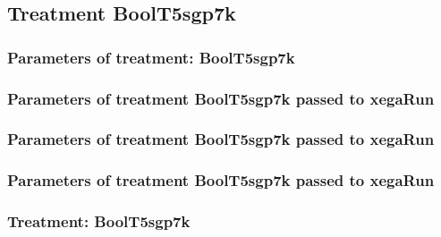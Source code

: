 \documentclass[18pt,c]{beamer}
\begin{document}
\clearpage
\subsection{Treatment BoolT5sgp7k}

 \begin{frame}
 \fontsize{8pt}{9pt}\selectfont
 \frametitle{  Parameters of treatment: BoolT5sgp7k 
 }

 \label{ExpFtParmTable032.tex}  
 \end{frame}


 \begin{frame}
 \fontsize{8pt}{9pt}\selectfont
 \frametitle{  Parameters of treatment BoolT5sgp7k passed to xegaRun
 }

 \label{ExpFtParmTable033.tex}  
 \end{frame}


 \begin{frame}
 \fontsize{8pt}{9pt}\selectfont
 \frametitle{  Parameters of treatment BoolT5sgp7k passed to xegaRun
 }

 \label{ExpFtParmTable034.tex}  
 \end{frame}


 \begin{frame}
 \fontsize{8pt}{9pt}\selectfont
 \frametitle{  Parameters of treatment BoolT5sgp7k passed to xegaRun
 }

 \label{ExpFtParmTable035.tex}  
 \end{frame}

 \begin{frame}
 \fontsize{8pt}{9pt}\selectfont
 \frametitle{ Treatment: BoolT5sgp7k }

 \label{ExpFStatsTable011.tex}  
 \end{frame}
\end{document}
